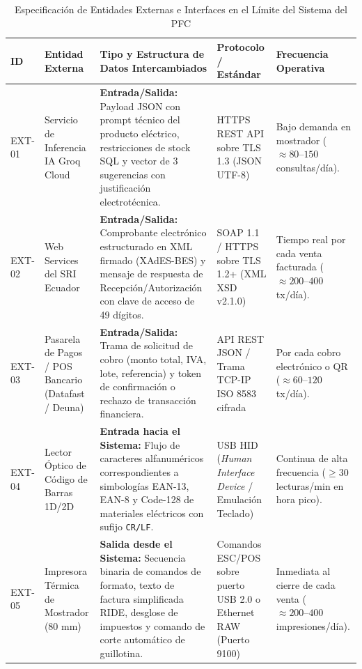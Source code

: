 \begin{table}[htbp]
\centering
\scriptsize
\caption{Especificación de Entidades Externas e Interfaces en el Límite del Sistema del PFC \cite{ieee29148, pohl2025}}
\label{tab:entidades_externas}
\begin{tabularx}{\textwidth}{l l Y l l}
\toprule
\textbf{ID} & \textbf{Entidad Externa} & \textbf{Tipo y Estructura de Datos Intercambiados} & \textbf{Protocolo / Estándar} & \textbf{Frecuencia Operativa} \\
\midrule
EXT-01 & Servicio de Inferencia IA Groq Cloud & \textbf{Entrada/Salida:} Payload JSON con prompt técnico del producto eléctrico, restricciones de stock SQL y vector de 3 sugerencias con justificación electrotécnica. & HTTPS REST API sobre TLS 1.3 (JSON UTF-8) & Bajo demanda en mostrador ($\approx 80\text{--}150$ consultas/día). \\
EXT-02 & Web Services del SRI Ecuador & \textbf{Entrada/Salida:} Comprobante electrónico estructurado en XML firmado (XAdES-BES) y mensaje de respuesta de Recepción/Autorización con clave de acceso de 49 dígitos. & SOAP 1.1 / HTTPS sobre TLS 1.2+ (XML XSD v2.1.0) & Tiempo real por cada venta facturada ($\approx 200\text{--}400$ tx/día). \\
EXT-03 & Pasarela de Pagos / POS Bancario (Datafast / Deuna) & \textbf{Entrada/Salida:} Trama de solicitud de cobro (monto total, IVA, lote, referencia) y token de confirmación o rechazo de transacción financiera. & API REST JSON / Trama TCP-IP ISO 8583 cifrada & Por cada cobro electrónico o QR ($\approx 60\text{--}120$ tx/día). \\
EXT-04 & Lector Óptico de Código de Barras 1D/2D & \textbf{Entrada hacia el Sistema:} Flujo de caracteres alfanuméricos correspondientes a simbologías EAN-13, EAN-8 y Code-128 de materiales eléctricos con sufijo \texttt{CR/LF}. & USB HID (\textit{Human Interface Device} / Emulación Teclado) & Continua de alta frecuencia ($\ge 30$ lecturas/min en hora pico). \\
EXT-05 & Impresora Térmica de Mostrador (80 mm) & \textbf{Salida desde el Sistema:} Secuencia binaria de comandos de formato, texto de factura simplificada RIDE, desglose de impuestos y comando de corte automático de guillotina. & Comandos ESC/POS sobre puerto USB 2.0 o Ethernet RAW (Puerto 9100) & Inmediata al cierre de cada venta ($\approx 200\text{--}400$ impresiones/día). \\
\bottomrule
\end{tabularx}
\end{table}

